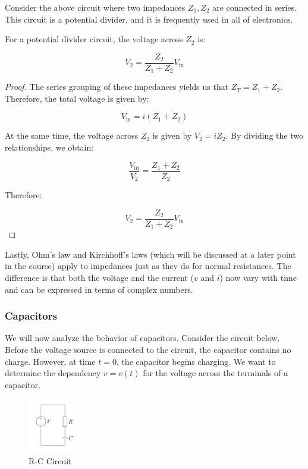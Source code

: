 \documentclass{article}
\begin{document}
Consider the above circuit where two impedances $Z_1, Z_2$ are connected in series. This circuit is a potential divider, and it is frequently used in all of electronics. 

\begin{proposition}
    For a potential divider circuit, the voltage across $Z_2$ is:

    \[ V_2 = \frac{Z_2}{Z_1 + Z_2}V_{\text{in}} \]
\end{proposition}

\begin{proof}
    The series grouping of these impedances yields us that $Z_T = Z_1 + Z_2$. Therefore, the total voltage is given by:

    \[ V_{\text{in}} = i(Z_1 + Z_2) \]

    At the same time, the voltage across $Z_2$ is given by $V_2 = iZ_2$. By dividing the two relationships, we obtain:

    \[ \frac{V_{\text{in}}}{V_2} = \frac{Z_1 + Z_2}{Z_2} \]

    Therefore:

    \[ V_2 = \frac{Z_2}{Z_1 + Z_2}V_{\text{in}} \]
\end{proof}

Lastly, Ohm's law and Kirchhoff's laws (which will be discussed at a later point in the course) apply to impedances just as they do for normal resistances. The difference is that both the voltage and the current ($v$ and $i$) now vary with time and can be expressed in terms of complex numbers.

\subsubsection{Capacitors}

We will now analyze the behavior of capacitors. Consider the circuit below. Before the voltage source is connected to the circuit, the capacitor contains no charge. However, at time $t = 0$, the capacitor begins charging. We want to determine the dependency $v = v(t)$ for the voltage across the terminals of a capacitor.

\begin{figure}[h]
    \centering
    \includegraphics[width=0.2\textwidth]{images/rccircuit.png}
    \caption{R-C Circuit}
    \label{fig:rc-circuit}
\end{figure}
\end{document}

